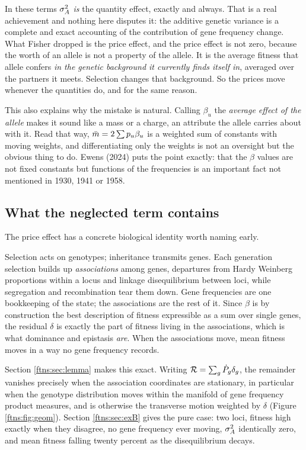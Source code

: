 In these terms $\sigma^{2}_{A}$ \emph{is} the quantity effect, exactly and always. That is a real achievement
and nothing here disputes it: the additive genetic variance is a complete and exact accounting of
the contribution of gene frequency change. What Fisher dropped is the price effect, and the price
effect is not zero, because the worth of an allele is not a property of the allele. It is the
average fitness that allele confers \emph{in the genetic background it currently finds itself in},
averaged over the partners it meets. Selection changes that background. So the prices move
whenever the quantities do, and for the same reason.

This also explains why the mistake is natural. Calling $\beta_u$ the \emph{average effect of the
allele} makes it sound like a mass or a charge, an attribute the allele carries about with it.
Read that way, $\bar{m}=2\sum p_u\beta_u$ is a weighted sum of constants with moving weights, and
differentiating only the weights is not an oversight but the obvious thing to do. Ewens (2024) puts
the point exactly: that the $\beta$ values are not fixed constants but functions of the frequencies
is an important fact not mentioned in 1930, 1941 or 1958.

\subsection{What the neglected term contains}

The price effect has a concrete biological identity worth naming early.

Selection acts on genotypes; inheritance transmits genes. Each generation selection builds up
\emph{associations} among genes, departures from Hardy Weinberg proportions within a locus and
linkage disequilibrium between loci, while segregation and recombination tear them down. Gene
frequencies are one bookkeeping of the state; the associations are the rest of it. Since $\beta$ is
by construction the best description of fitness expressible as a sum over single genes, the residual
$\delta$ is exactly the part of fitness living in the associations, which is what dominance and
epistasis \emph{are}. When the associations move, mean fitness moves in a way no gene frequency
records.

Section \ref{ftns:sec:lemma} makes this exact. Writing $\mathcal{R}=\sum_g\dot P_g\delta_g$, the remainder
vanishes precisely when the association coordinates are stationary, in particular when the genotype distribution moves within the manifold of gene frequency
product measures, and is otherwise the transverse motion weighted by $\delta$
(Figure \ref{ftns:fig:geom}). Section \ref{ftns:sec:exB} gives the pure case: two loci, fitness high exactly
when they disagree, no gene frequency ever moving, $\sigma^{2}_{A}$ identically zero, and mean fitness falling
twenty percent as the disequilibrium decays.

